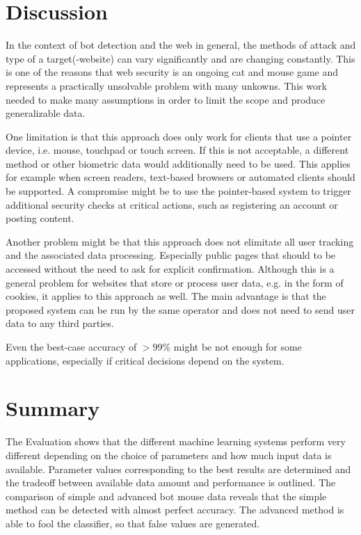 \documentclass[
    fontsize=12pt,
    headings=small,
    parskip=half,           %
    bibliography=totoc,
    numbers=noenddot,       %
    open=any,               %
    final,                   %
    table
]{scrreprt}
\begin{document}
\section{Discussion}

In the context of bot detection and the web in general, the methods of attack and type of a target(-website) can vary significantly and are changing constantly. This is one of the reasons that web security is an ongoing cat and mouse game and represents a practically unsolvable problem with many unkowns. This work needed to make many assumptions in order to limit the scope and produce generalizable data.

One limitation is that this approach does only work for clients that use a pointer device, i.e. mouse, touchpad or touch screen. If this is not acceptable, a different method or other biometric data would additionally need to be used. This applies for example when screen readers, text-based browsers or automated clients should be supported. A compromise might be to use the pointer-based system to trigger additional security checks at critical actions, such as registering an account or posting content.

Another problem might be that this approach does not elimitate all user tracking and the associated data processing. Especially public pages that should to be accessed without the need to ask for explicit confirmation. Although this is a general problem for websites that store or process user data, e.g. in the form of cookies, it applies to this approach as well. The main advantage is that the proposed system can be run by the same operator and does not need to send user data to any third parties.

Even the best-case accuracy of $>99\%$ might be not enough for some applications, especially if critical decisions depend on the system.

\section{Summary}

The Evaluation shows that the different machine learning systems perform very different depending on the choice of parameters and how much input data is available. Parameter values corresponding to the best results are determined and the tradeoff between available data amount and performance is outlined. The comparison of simple and advanced bot mouse data reveals that the simple method can be detected with almost perfect accuracy. The advanced method is able to fool the classifier, so that false values are generated.
\end{document}
